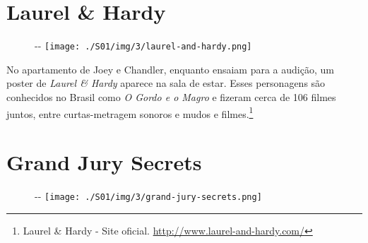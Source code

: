 \hypertarget{laurel-hardy}{%
\section{Laurel \& Hardy}\label{laurel-hardy}}

\begin{figure}[!ht]
  \begin{adjustwidth}{-\oddsidemargin-1in}{-\rightmargin}
    \centering
    \texttt{[image: ./S01/img/3/laurel-and-hardy.png]}
  \end{adjustwidth}
\end{figure}

No apartamento de Joey e Chandler, enquanto ensaiam para a audição, um
poster de \emph{Laurel \& Hardy} aparece na sala de estar. Esses
personagens são conhecidos no Brasil como \emph{O Gordo e o Magro} e
fizeram cerca de 106 filmes juntos, entre curtas-metragem sonoros e
mudos e filmes.\footnote{\sloppy Laurel \& Hardy - Site oficial. \url{http://www.laurel-and-hardy.com/}}

\hypertarget{grand-jury-secrets}{%
\section{Grand Jury Secrets}\label{grand-jury-secrets}}

\begin{figure}[!ht]
  \begin{adjustwidth}{-\oddsidemargin-1in}{-\rightmargin}
    \centering
    \texttt{[image: ./S01/img/3/grand-jury-secrets.png]}
  \end{adjustwidth}
\end{figure}

